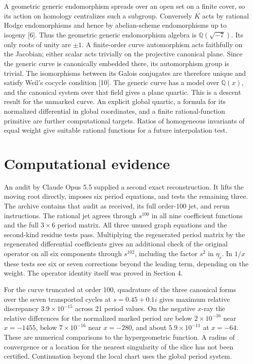 \documentclass[10pt]{article}
\newcommand{\Q}{\mathbb Q}\newcommand{\C}{\mathbb C}\newcommand{\Z}{\mathbb Z}
\begin{document}
A geometric generic endomorphism spreads over an open set on a finite cover, so its action on homology centralizes such a subgroup. Conversely $K$ acts by rational Hodge endomorphisms and hence by abelian-scheme endomorphisms up to isogeny [6]. Thus the geometric generic endomorphism algebra is $\Q(\sqrt{-7})$. Its only roots of unity are $\pm1$. A finite-order curve automorphism acts faithfully on the Jacobian; either scalar acts trivially on the projective canonical plane. Since the generic curve is canonically embedded there, its automorphism group is trivial. The isomorphisms between its Galois conjugates are therefore unique and satisfy Weil's cocycle condition [10]. The generic curve has a model over $\Q(x)$, and the canonical system over that field gives a plane quartic. This is a descent result for the unmarked curve. An explicit global quartic, a formula for its normalized differential in global coordinates, and a finite rational-function primitive are further computational targets. Ratios of homogeneous invariants of equal weight give suitable rational functions for a future interpolation test.

\section{Computational evidence}
An audit by Claude Opus 5.5 supplied a second exact reconstruction. It lifts the moving root directly, imposes six period equations, and tests the remaining three. The archive contains that audit as received, its full order-$100$ jet, and rerun instructions. The rational jet agrees through $s^{100}$ in all nine coefficient functions and the full $3\times6$ period matrix. All three unused graph equations and the second-kind residue tests pass. Multiplying the regenerated period matrix by the regenerated differential coefficients gives an additional check of the original operator on all six components through $s^{102}$, including the factor $s^2$ in $\eta_s$. In $1/x$ these tests see six or seven corrections beyond the leading term, depending on the weight. The operator identity itself was proved in Section 4.

For the curve truncated at order 100, quadrature of the three canonical forms over the seven transported cycles at $s=0.45+0.1i$ gives maximum relative discrepancy $3.9\times10^{-15}$ across 21 period values. On the negative $x$-ray the relative differences for the normalized marked period are below $2\times10^{-16}$ near $x=-1455$, below $7\times10^{-16}$ near $x=-280$, and about $5.9\times10^{-11}$ at $x=-64$. These are numerical comparisons to the hypergeometric function. A radius of convergence or a location for the nearest singularity of the slice has not been certified. Continuation beyond the local chart uses the global period system.
\end{document}
